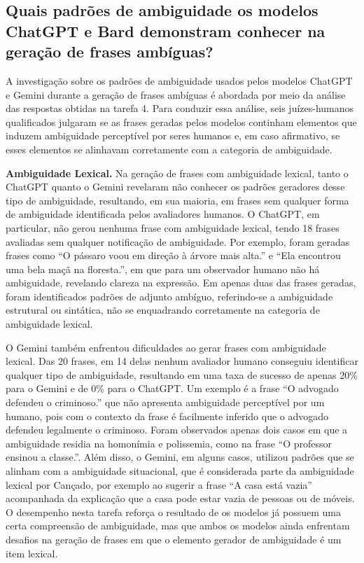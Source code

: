 \subsection{Quais padrões de ambiguidade os modelos ChatGPT e Bard demonstram conhecer na geração de frases ambíguas?}
\label{resultados-q-5}

A investigação sobre os padrões de ambiguidade usados pelos modelos ChatGPT e Gemini durante a geração de frases ambíguas é abordada por meio da análise das respostas obtidas na tarefa 4. Para conduzir essa análise, seis juízes-humanos qualificados julgaram se as frases geradas pelos modelos continham elementos que induzem ambiguidade perceptível por seres humanos e, em caso afirmativo, se esses elementos se alinhavam corretamente com a categoria de ambiguidade.


\textbf{Ambiguidade Lexical.} Na geração de frases com ambiguidade lexical, tanto o ChatGPT quanto o Gemini revelaram não conhecer os padrões geradores desse tipo de ambiguidade, resultando, em sua maioria, em frases sem qualquer forma de ambiguidade identificada pelos avaliadores humanos. O ChatGPT, em particular, não gerou nenhuma frase com ambiguidade lexical, tendo 18 frases avaliadas sem qualquer notificação de ambiguidade. Por exemplo, foram geradas frases como \enquote{O pássaro voou em direção à árvore mais alta.} e \enquote{Ela encontrou uma bela maçã na floresta.}, em que para um observador humano não há ambiguidade, revelando clareza na expressão. Em apenas duas das frases geradas, foram identificados padrões de adjunto ambíguo, referindo-se a ambiguidade estrutural ou sintática, não se enquadrando corretamente na categoria de ambiguidade lexical.

O Gemini também enfrentou dificuldades ao gerar frases com ambiguidade lexical. Das 20 frases, em 14 delas nenhum avaliador humano conseguiu identificar qualquer tipo de ambiguidade, resultando em uma taxa de sucesso de apenas 20\% para o Gemini e de 0\% para o ChatGPT. Um exemplo é a frase \enquote{O advogado defendeu o criminoso.} que não apresenta ambiguidade perceptível por um humano, pois com o contexto da frase é facilmente inferido que o advogado defendeu legalmente o criminoso. Foram observados apenas dois casos em que a ambiguidade residia na homonímia e polissemia, como na frase \enquote{O professor ensinou a classe.}. Além disso, o Gemini, em alguns casos, utilizou padrões que se alinham com a ambiguidade situacional, que é considerada parte da ambiguidade lexical por Cançado, por exemplo ao sugerir a frase \enquote{A casa está vazia} acompanhada da explicação que a casa pode estar vazia de pessoas ou de móveis. O desempenho nesta tarefa reforça o resultado de os modelos já possuem uma certa compreensão de ambiguidade, mas que ambos os modelos ainda enfrentam desafios na geração de frases em que o elemento gerador de ambiguidade é um item lexical.


